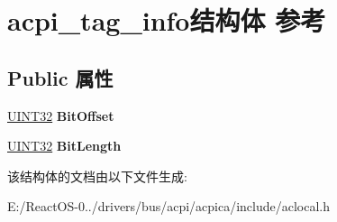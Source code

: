 \hypertarget{structacpi__tag__info}{}\section{acpi\+\_\+tag\+\_\+info结构体 参考}
\label{structacpi__tag__info}
\subsection*{Public 属性}
\begin{DoxyCompactItemize}
\item 
\mbox{\label{structacpi__tag__info_a40bfb4b2f1e4298eb5b6dbc13cc3ed65}} 
\hyperlink{_processor_bind_8h_ae1e6edbbc26d6fbc71a90190d0266018}{U\+I\+N\+T32} {\bfseries Bit\+Offset}
\item 
\mbox{\label{structacpi__tag__info_a3ba29d5b8324f420b0cce4afa2cde89e}} 
\hyperlink{_processor_bind_8h_ae1e6edbbc26d6fbc71a90190d0266018}{U\+I\+N\+T32} {\bfseries Bit\+Length}
\end{DoxyCompactItemize}


该结构体的文档由以下文件生成\+:\begin{DoxyCompactItemize}
\item 
E\+:/\+React\+O\+S-\/0../drivers/bus/acpi/acpica/include/aclocal.\+h\end{DoxyCompactItemize}
